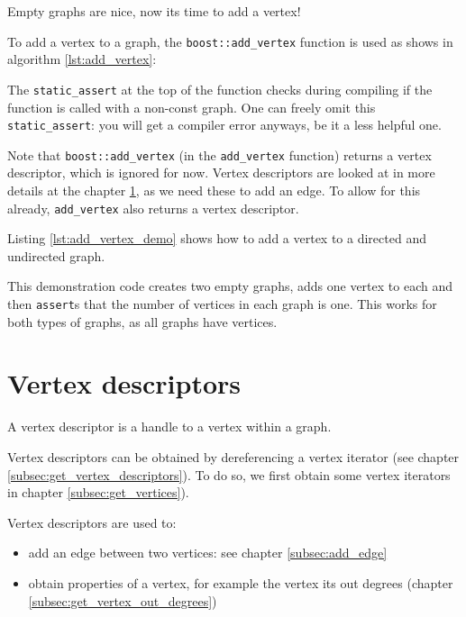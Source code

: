Empty graphs are nice, now its time to add a vertex!

To add a vertex to a graph, 
the \verb;boost::add_vertex; 
function is used as shows in algorithm \ref{lst:add_vertex}:



The \verb;static_assert; 
at the top of the function checks during compiling if the function is called
with a non-const graph.
One can freely omit this \verb;static_assert;: you will get a compiler error anyways,
be it a less helpful one.

Note that \verb;boost::add_vertex; (in the \verb;add_vertex; function) 
returns a vertex
descriptor, which is ignored for now.
Vertex descriptors are looked at in more details 
at the chapter \ref{subsec:Vertex-descriptors}, 
as we need these to add an edge.
To allow for this already, \verb;add_vertex; also returns a vertex descriptor.

Listing \ref{lst:add_vertex_demo}
shows how to add a vertex to a directed and undirected graph.



This demonstration code creates two empty graphs, adds one vertex to each
and then \verb;assert;s that the number of vertices in each graph is one.
This works for both types of graphs, as all graphs have vertices.

\section{Vertex descriptors}
\label{subsec:Vertex-descriptors}

A vertex descriptor is a handle to a vertex within a graph.

Vertex descriptors can be obtained by dereferencing a vertex iterator (see
chapter \ref{subsec:get_vertex_descriptors}).
To do so, we first obtain some vertex iterators in chapter 
\ref{subsec:get_vertices}).
 
Vertex descriptors are used to:

\begin{itemize}
  \item add an edge between two vertices: 
    see chapter \ref{subsec:add_edge}
  \item obtain properties of a vertex, 
    for example the vertex its out degrees 
    (chapter \ref{subsec:get_vertex_out_degrees})
\end{itemize}

